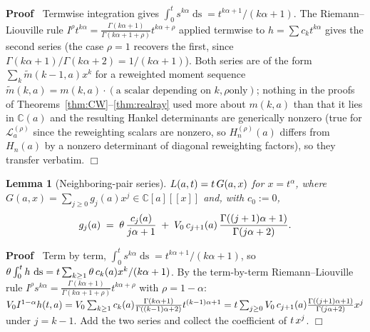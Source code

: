 \documentclass{article}
\newcommand{\assign}{:=}
\newcommand{\tmop}[1]{\ensuremath{\operatorname{#1}}}
\newenvironment{proof}{\noindent\textbf{Proof\ }}{\hspace*{\fill}$\Box$\medskip}
\newtheorem{lemma}{Lemma}
{\theorembodyfont{\rmfamily\small}\newtheorem{problem}{Problem}}
\newcommand{\C}{\mathbb{C}}
\newcommand{\Lop}{\mathcal{L}}
\begin{document}
\begin{proof}
  Termwise integration gives $\int_0^t s^{k \alpha}  \tmop{ds} = t^{k \alpha
  + 1} / (k \alpha + 1)$. The Riemann--Liouville rule $I^{\rho} t^{k \alpha} =
  \frac{\Gamma (k \alpha + 1)}{\Gamma (k \alpha + 1 + \rho)} t^{k \alpha +
  \rho}$ applied termwise to $h = \sum c_k t^{k \alpha}$ gives the second
  series (the case $\rho = 1$ recovers the first, since $\Gamma (k \alpha +
  1) / \Gamma (k \alpha + 2) = 1 / (k \alpha + 1)$). Both series are of the
  form $\sum_k \tilde{m} (k - 1, a) x^k$ for a reweighted moment sequence
  $\tilde{m} (k, a) = m (k, a) \cdot (\text{a scalar depending on $k, \rho$
  only})$; nothing in the proofs of
  Theorems~\ref{thm:CW}--\ref{thm:realray} used more about $m (k, a)$ than
  that it lies in $\C (a)$ and the resulting Hankel determinants are
  generically nonzero (true for $\Lop_a^{(\rho)}$ since the reweighting
  scalars are nonzero, so $H_n^{(\rho)} (a)$ differs from $H_n (a)$ by a
  nonzero determinant of diagonal reweighting factors), so they transfer
  verbatim.
\end{proof}

\begin{lemma}
  [Neighboring-pair series]\label{lem:neighboring} $L (a, t) = t \hspace{0.17em}
  G (a, x)$ for $x = t^{\alpha}$, where $G (a, x) = \sum_{j \ge 0} g_j (a) x^j
  \in \C [a] [[x]]$ and, with $c_0 \assign 0$,
  \[ g_j (a) \hspace{0.27em} = \hspace{0.27em} \theta \hspace{0.17em}
     \frac{c_j (a)}{j \alpha + 1} \hspace{0.27em} + \hspace{0.27em} V_0
     \hspace{0.17em} c_{j + 1} (a)  \hspace{0.17em} \frac{\Gamma ((j + 1)
     \alpha + 1)}{\Gamma (j \alpha + 2)} . \]
\end{lemma}

\begin{proof}
  Term by term, $\int_0^t s^{k \alpha}  \tmop{ds} = t^{k \alpha + 1} / (k
  \alpha + 1)$, so $\theta \int_0^t h  \hspace{0.17em} \tmop{ds} = t
  \sum_{k \ge 1} \theta \hspace{0.17em} c_k (a) x^k / (k \alpha + 1)$. By the
  term-by-term Riemann--Liouville rule $I^{\rho} s^{k \alpha} = \frac{\Gamma
  (k \alpha + 1)}{\Gamma (k \alpha + 1 + \rho)} t^{k \alpha + \rho}$ with
  $\rho = 1 - \alpha$: $V_0 I^{1 - \alpha} h (t, a) = V_0 \sum_{k \ge 1} c_k
  (a) \frac{\Gamma (k \alpha + 1)}{\Gamma ((k - 1) \alpha + 2)}  t^{(k - 1)
  \alpha + 1} = t \sum_{j \ge 0} V_0  \hspace{0.17em} c_{j + 1} (a)
  \frac{\Gamma ((j + 1) \alpha + 1)}{\Gamma (j \alpha + 2)} x^j$ under $j = k
  - 1$. Add the two series and collect the coefficient of $t \hspace{0.17em}
  x^j$.
\end{proof}
\end{document}
